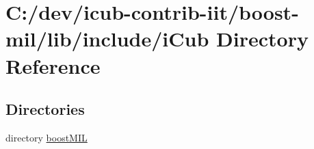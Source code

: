 \section{C\+:/dev/icub-\/contrib-\/iit/boost-\/mil/lib/include/i\+Cub Directory Reference}
\label{dir_05906369c2d654c318c8e5f0b9121080}
\subsection*{Directories}
\begin{DoxyCompactItemize}
\item 
directory \hyperlink{dir_f0ce595ec536a607538296da3a206f53}{boost\+M\+I\+L}
\end{DoxyCompactItemize}
